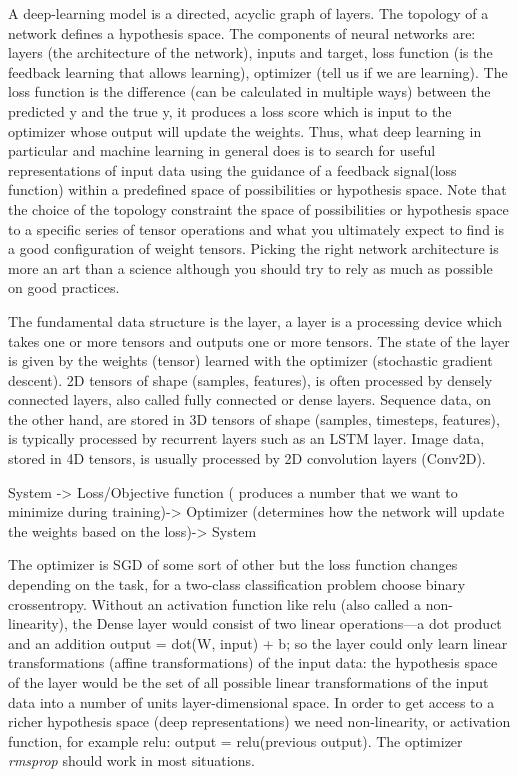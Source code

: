 \documentclass[11pt]{article}
\begin{document}
A deep-learning model is a directed, acyclic graph of layers. The topology of a network defines a hypothesis space.
The components of neural networks are: layers (the architecture of the network), inputs and target, loss function (is the feedback learning that allows learning), optimizer (tell us if we are learning). The loss function is the difference (can be calculated in multiple ways) between the predicted y and the true y, it produces a loss score which is input to the optimizer whose output will update the weights. 
Thus, what deep learning in particular and machine learning in general does is to search for useful representations of input data using the guidance of a feedback signal(loss function) within a predefined space of possibilities or hypothesis space. Note that the choice of the topology constraint the space of possibilities or hypothesis space to a specific series of tensor operations and what you ultimately expect to find is a good configuration of weight tensors. Picking the right network architecture is more an art than a science although you should try to rely as much as possible on good practices.

The fundamental data structure is the layer, a layer is a processing device which takes one or more tensors and outputs one or more tensors. The state of the layer is given by the weights (tensor) learned with the optimizer (stochastic gradient descent).
2D tensors of shape (samples, features), is often processed by densely connected layers, also called fully connected or dense layers. Sequence data, on the other hand, are stored in 3D tensors of shape (samples, timesteps, features), is typically processed by recurrent layers such as an LSTM layer. Image data, stored in 4D tensors, is usually processed by 2D convolution layers (Conv2D).


System -> Loss/Objective function ( produces a number that we want to minimize during training)-> Optimizer (determines how the network will update the weights based on the loss)-> System 

The optimizer is SGD of some sort of other but the loss function changes depending on the task, for a two-class classification problem choose binary crossentropy. Without an activation function like relu (also called a non-linearity), the Dense layer would consist of two linear operations—a dot product and an addition output = dot(W, input) + b; so the layer could only learn linear transformations (affine transformations) of the input data: the hypothesis space of the layer would be the set of all possible linear transformations of the input data into a number of units layer-dimensional space. 
In order to get access to a richer hypothesis space (deep representations) we need non-linearity, or activation function, for example relu: output = relu(previous output). The optimizer \textit{rmsprop} should work in most situations.
\end{document}
